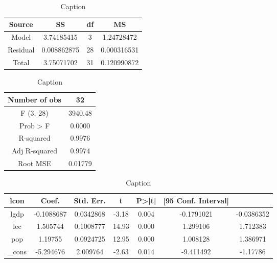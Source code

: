 \begin{table}
    \centering
    \begin{tabular}{|c|c|c|c|} \hline 
         Source&  SS&  df& MS
\\ \hline 
         Model&  3.74185415&  3& 1.24728472
\\ \hline 
         Residual&  0.008862875&  28& 0.000316531
\\ \hline 
         Total&  3.75071702&  31& 0.120990872\\ \hline
    \end{tabular}
    \caption{Caption}
    \label{tab:my_label}
\end{table}

\begin{table}
    \centering
    \begin{tabular}{|c|c|} \hline 
         Number of obs& 32
\\ \hline 
         F (3, 28)& 3940.48
\\ \hline 
         Prob > F& 0.0000
\\ \hline 
         R-squared& 0.9976
\\ \hline 
         Adj R-squared& 0.9974
\\ \hline 
         Root MSE& 0.01779\\ \hline
    \end{tabular}
    \caption{Caption}
    \label{tab:my_label}
\end{table}

\begin{table}
    \centering
    \begin{tabular}{|c|c|c|c|c|c|c|} \hline 
         lcon&  Coef.&  Std. Err.&  t&  P>|t|&  [95 Conf. Interval]& 
\\ \hline 
         lgdp&  -0.1088687&  0.0342868&  -3.18&  0.004&  -0.1791021& -0.0386352
\\ \hline 
         lec&  1.505744&  0.1008777&  14.93&  0.000&  1.299106& 1.712383
\\ \hline 
         pop&  1.19755&  0.0924725&  12.95&  0.000&  1.008128& 1.386971
\\ \hline 
         _cons&  -5.294676&  2.009764&  -2.63&  0.014&  -9.411492& -1.17786\\ \hline
    \end{tabular}
    \caption{Caption}
    \label{tab:my_label}
\end{table}